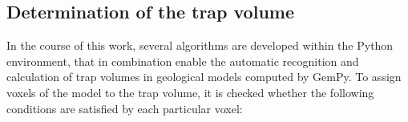 		
		\subsection{Determination of the trap volume}
		In the course of this work, several algorithms are developed within the Python environment, that in combination enable the automatic recognition and calculation of trap volumes in geological models computed by GemPy. To assign voxels of the model to the trap volume, it is checked whether the following conditions are satisfied by each particular voxel: 
